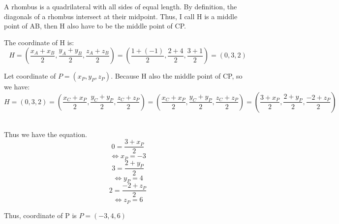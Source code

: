 \documentclass{article}
\begin{document}
\begin{enumerate}[label=({\alph*})]
            A rhombus is a quadrilateral with all sides of equal length. By definition, the diagonals of a rhombus intersect at their midpoint. Thus, I call H is a middle point of AB, then H also have to be the middle point of CP.

            The coordinate of H is:
            \[H = (\frac{x_{A} + x_{B}}{2}, \frac{y_{A} + y_{B}}{2}, \frac{z_{A} + z_{B}}{2}) = (\frac{1 + (-1)}{2}, \frac{2 + 4}{2}, \frac{3 + 1}{2}) = (0, 3, 2)\]


            Let coordinate of \(P = (x_{P}, y_{P}, z_{P})\). Because H also the middle point of CP, so we have:
            \[H = (0,3,2) = (\frac{x_{C} + x_{P}}{2}, \frac{y_{C} + y_{P}}{2}, \frac{z_{C} + z_{P}}{2}) = (\frac{x_{C} + x_{P}}{2}, \frac{y_{C} + y_{P}}{2}, \frac{z_{C} + z_{P}}{2}) = (\frac{3 + x_{P}}{2}, \frac{2 + y_{P}}{2}, \frac{-2 + z_{P}}{2})\]\

            Thus we have the equation.
            \begin{equation}
                0 = \frac{3 + x_{P}}{2}
            \end{equation}
            \[\Leftrightarrow x_{P} = -3\]
            \begin{equation}
                3 = \frac{2 + y_{P}}{2}
            \end{equation}
            \[\Leftrightarrow y_{P} = 4\]
            \begin{equation}
                2 = \frac{-2 + z_{P}}{2}
            \end{equation}
            \[\Leftrightarrow z_{P} = 6\]


            Thus, coordinate of P is \(P = (-3, 4, 6)\)
        \end{enumerate}
    
\end{document}
